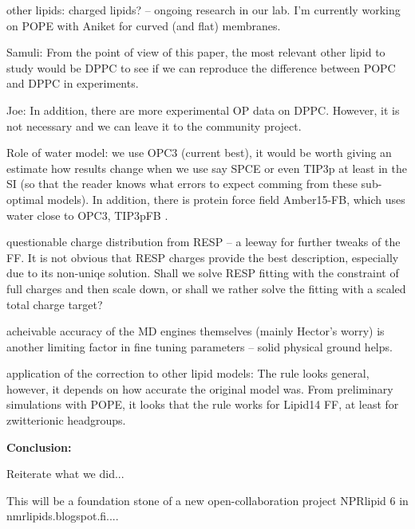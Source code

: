 \documentclass[aip,jcp,twocolumn]{revtex4}
\begin{document}
{other lipids: charged lipids? -- ongoing research in our lab.
I'm currently working on POPE with Aniket for curved (and flat) membranes. 

Samuli: From the point of view of this paper, the most relevant other lipid to study would be DPPC to see if we can reproduce the difference between POPC and DPPC in experiments.

Joe: In addition, there are more experimental OP data on DPPC. However, it is not necessary and we can leave it to the community project. 

Role of water model: we use OPC3 (current best), it would be worth giving an estimate how results change when we use say SPCE or even TIP3p at least in the SI (so that the reader knows what errors to expect comming from these sub-optimal models). 
In addition, there is protein force field Amber15-FB, which uses water close to OPC3, TIP3pFB .

questionable charge distribution from RESP -- a leeway for further tweaks of the FF.
It is not obvious that RESP charges provide the best description, especially due to its non-uniqe solution. 
Shall we solve RESP fitting with the constraint of full charges and then scale down, or shall we rather solve the fitting with a scaled total charge target?

acheivable accuracy of the MD engines themselves (mainly Hector's worry) is another limiting factor in fine tuning parameters -- solid physical ground helps.

application of the correction to other lipid models: The rule looks general, however, it depends on how accurate the original model was.
From preliminary simulations with POPE, it looks that the rule works for Lipid14 FF, at least for zwitterionic headgroups.

\textbf{Conclusion:}

Reiterate what we did...

This will be a foundation stone of a new open-collaboration project NPRlipid 6 in nmrlipids.blogspot.fi....
















%

}
\end{document}
